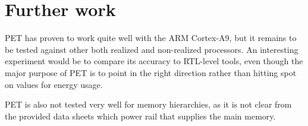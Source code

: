 \section{Further work}

PET has proven to work quite well with the ARM Cortex-A9, but it remains to be
tested against other both realized and non-realized processors. An interesting
experiment would be to compare its accuracy to RTL-level tools, even though the
major purpose of PET is to point in the right direction rather than hitting spot
on values for energy usage.

PET is also not tested very well for memory hierarchies, as it is not clear from
the provided data sheets which power rail that supplies the main memory.



